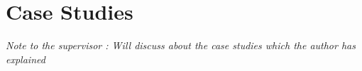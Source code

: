 \chapter{Case Studies}
\textit{Note to the supervisor : Will discuss about the case studies which the author has explained}